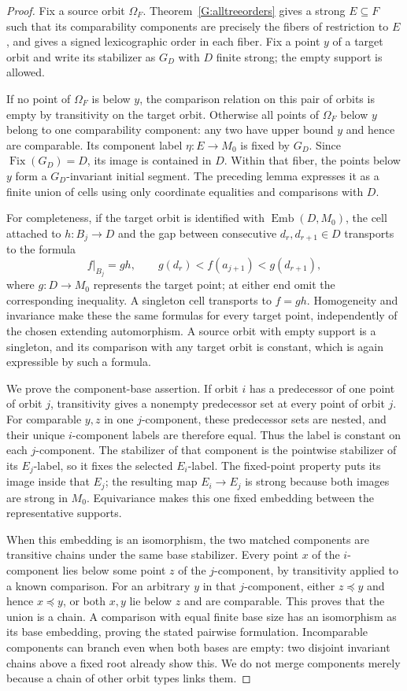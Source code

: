 \begin{proof}
Fix a source orbit $\Omega_F$. Theorem~\ref{G:alltreeorders}
gives a strong $E\subseteq F$ such that its comparability
components are precisely the fibers of restriction to $E$,
and gives a signed lexicographic order in each fiber.
Fix a point $y$ of a target orbit and write its stabilizer as
$G_D$ with $D$ finite strong; the empty support is allowed.

If no point of $\Omega_F$ is below $y$, the comparison relation
on this pair of orbits is empty by transitivity on the target
orbit. Otherwise all points of $\Omega_F$ below $y$ belong to
one comparability component: any two have upper bound $y$ and
hence are comparable. Its component label $\eta:E\to M_0$
is fixed by $G_D$. Since $\operatorname{Fix}(G_D)=D$, its image
is contained in $D$. Within that fiber, the points below $y$
form a $G_D$-invariant initial segment. The preceding lemma
expresses it as a finite union of cells using only coordinate
equalities and comparisons with $D$.

For completeness, if the target orbit is identified with
$\operatorname{Emb}(D,M_0)$, the cell attached to
$h:B_j\to D$ and the gap between consecutive $d_r,d_{r+1}\in D$
transports to the formula
\[
 f|_{B_j}=g h,\qquad
 g(d_r)<f(a_{j+1})<g(d_{r+1}),
\]
where $g:D\to M_0$ represents the target point; at either end
omit the corresponding inequality. A singleton cell transports
to $f=gh$. Homogeneity and invariance make these the same
formulas for every target point, independently of the chosen
extending automorphism. A source orbit with empty support is
a singleton, and its comparison with any target orbit is
constant, which is again expressible by such a formula.

We prove the component-base assertion. If orbit $i$ has a
predecessor of one point of orbit $j$, transitivity gives a
nonempty predecessor set at every point of orbit $j$. For
comparable $y,z$ in one $j$-component, these predecessor sets
are nested, and their unique $i$-component labels are therefore
equal. Thus the label is constant on each $j$-component.
The stabilizer of that component is the pointwise stabilizer
of its $E_j$-label, so it fixes the selected $E_i$-label.
The fixed-point property puts its image inside that $E_j$;
the resulting map $E_i\to E_j$ is strong because both images
are strong in $M_0$. Equivariance makes this one fixed
embedding between the representative supports.

When this embedding is an isomorphism, the two matched
components are transitive chains under the same base
stabilizer. Every point $x$ of the $i$-component lies below
some point $z$ of the $j$-component, by transitivity applied
to a known comparison. For an arbitrary $y$ in that
$j$-component, either $z\preceq y$ and hence $x\preceq y$,
or both $x,y$ lie below $z$ and are comparable. This proves
that the union is a chain. A comparison with equal finite
base size has an isomorphism as its base embedding, proving
the stated pairwise formulation. Incomparable components can
branch even when both bases are empty: two disjoint invariant
chains above a fixed root already show this. We do not merge
components merely because a chain of other orbit types links
them.


\end{proof}
